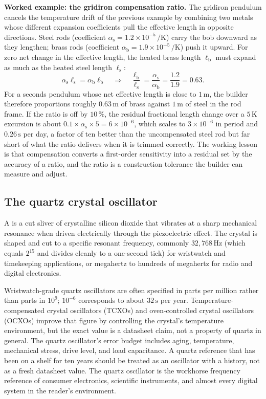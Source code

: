 \textbf{Worked example: the gridiron compensation ratio.} The
gridiron pendulum cancels the temperature drift of the previous
example by combining two metals whose different expansion
coefficients pull the effective length in opposite directions. Steel
rods (coefficient $\alpha_{\text{s}} = 1.2 \times 10^{-5} \,\si{\per
\kelvin}$) carry the bob downward as they lengthen; brass rods
(coefficient $\alpha_{\text{b}} = 1.9 \times 10^{-5} \,\si{\per
\kelvin}$) push it upward. For zero net change in the effective
length, the heated brass length $\ell_{\text{b}}$ must expand as much
as the heated steel length $\ell_{\text{s}}$:
\[
\alpha_{\text{s}} \ell_{\text{s}} = \alpha_{\text{b}}
\ell_{\text{b}} \quad\Longrightarrow\quad
\frac{\ell_{\text{b}}}{\ell_{\text{s}}} =
\frac{\alpha_{\text{s}}}{\alpha_{\text{b}}} =
\frac{1.2}{1.9} = 0.63 .
\]
For a seconds pendulum whose net effective length is close to
$1 \,\si{\meter}$, the builder therefore proportions roughly
$0.63 \,\si{\meter}$ of brass against $1 \,\si{\meter}$ of steel in
the rod frame. If the ratio is off by $10\,\%$, the residual
fractional length change over a $5 \,\si{\kelvin}$ excursion is about
$0.1 \times \alpha_{\text{s}} \times 5 = 6 \times 10^{-6}$, which
scales to $3 \times 10^{-6}$ in period and $0.26 \,\si{\second}$ per
day, a factor of ten better than the uncompensated steel rod but far
short of what the ratio delivers when it is trimmed correctly. The
working lesson is that compensation converts a first-order
sensitivity into a residual set by the accuracy of a ratio, and the
ratio is a construction tolerance the builder can measure and adjust.

\subsection{The quartz crystal oscillator}

A  is a cut sliver of crystalline silicon
dioxide that vibrates at a sharp mechanical resonance when driven
electrically through the piezoelectric effect. The crystal is shaped
and cut to a specific resonant frequency, commonly $32{,}768 \,\si
{\hertz}$ (which equals $2^{15}$ and divides cleanly to a one-second
tick) for wristwatch and timekeeping applications, or megahertz to
hundreds of megahertz for radio and digital electronics.

Wristwatch-grade quartz oscillators are often specified in parts per
million rather than parts in $10^{9}$; $10^{-6}$ corresponds to
about $32 \,\si{\second}$ per year. Temperature-compensated crystal
oscillators (TCXOs) and oven-controlled crystal oscillators (OCXOs)
improve that figure by controlling the crystal's temperature
environment, but the exact value is a datasheet claim, not a
property of quartz in general. The quartz oscillator's error budget
includes aging, temperature, mechanical stress, drive level, and
load capacitance. A quartz reference that has been on a shelf for
ten years should be treated as an oscillator with a history, not as
a fresh datasheet value. The quartz oscillator is the workhorse
frequency reference of consumer electronics, scientific instruments,
and almost every digital system in the reader's environment.

